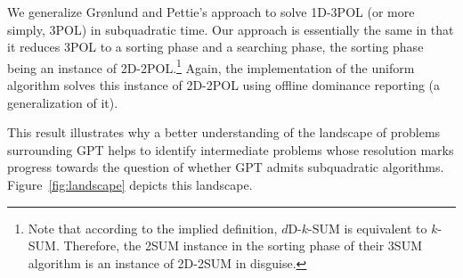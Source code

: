 We generalize Gr\o nlund and Pettie's approach to solve 1D-3POL (or
more simply, 3POL) in subquadratic time. Our approach is essentially the same
in that it reduces 3POL to a sorting phase and a searching phase, the sorting
phase being an instance of 2D-2POL.\footnote{Note that according to the implied
definition, \(d\)D-\(k\)-SUM is equivalent to \(k\)-SUM. Therefore, the 2SUM
instance in the sorting phase of their 3SUM algorithm is an instance of 2D-2SUM
in disguise.} Again, the implementation of the uniform algorithm solves this
instance of 2D-2POL using offline dominance reporting (a generalization of it).

This result illustrates why a better understanding of the landscape of problems
surrounding GPT helps to identify intermediate problems whose resolution marks
progress towards the question of whether GPT admits subquadratic algorithms.
%
Figure~\ref{fig:landscape} depicts this landscape.
